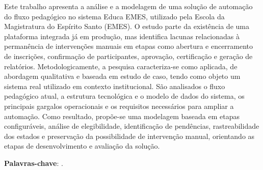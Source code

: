 %
%
%

\setlength{\absparsep}{18pt}
\begin{resumo}

Este trabalho apresenta a análise e a modelagem de uma solução de automação do
fluxo pedagógico no sistema Educa EMES, utilizado pela Escola da Magistratura do
Espírito Santo (EMES). O estudo parte da existência de uma plataforma integrada
já em produção, mas identifica lacunas relacionadas à permanência de
intervenções manuais em etapas como abertura e encerramento de inscrições,
confirmação de participantes, aprovação, certificação e geração de relatórios.
Metodologicamente, a pesquisa caracteriza-se como aplicada, de abordagem
qualitativa e baseada em estudo de caso, tendo como objeto um sistema real
utilizado em contexto institucional. São analisados o fluxo pedagógico atual, a
estrutura tecnológica e o modelo de dados do sistema, os principais gargalos
operacionais e os requisitos necessários para ampliar a automação. Como
resultado, propõe-se uma modelagem baseada em etapas
configuráveis, análise de elegibilidade, identificação de pendências,
rastreabilidade dos estados e preservação da possibilidade de intervenção
manual, orientando as etapas de desenvolvimento e avaliação da solução.

\textbf{Palavras-chave}: \imprimirpalavraschave.
\end{resumo}
